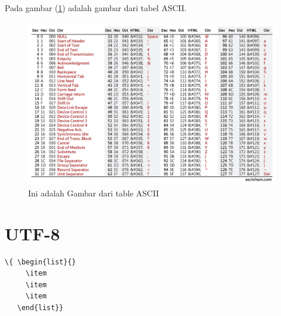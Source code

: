     Pada gambar (\ref{fig:ASCII}) adalah gambar dari tabel ASCII.
\begin{figure}[!htbp]
  \centering
  \includegraphics[width=.75\textwidth]{figures/Standar/ASCII.jpg}
  \caption{Ini adalah Gambar dari table ASCII}\label{fig:ASCII}
\end{figure}

\section{UTF-8}
\begin{lstlisting}
\{ \begin{list}{}
     \item 
     \item 
     \item 
   \end{list}}
\end{lstlisting} 